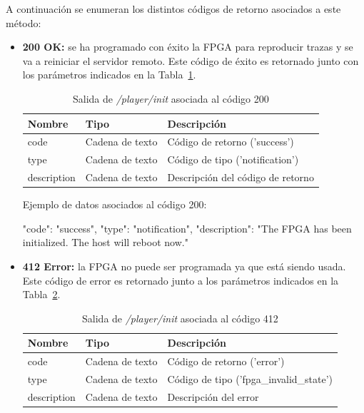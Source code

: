 A continuación se enumeran los distintos códigos de retorno asociados a este método:
\begin{itemize}

\item{\textbf{200 OK:} se ha programado con éxito la \gls{FPGA} para reproducir \glspl{traza} y se va a reiniciar el servidor remoto.
Este código de éxito es retornado junto con los parámetros indicados en la Tabla~\ref{extra:api:playerinit:ok}.
\begin{table}[H]
\centering
\begin{tabular}{|l|l|l|}
\hline
\rowcolor[HTML]{F5F5F5}
\textbf{Nombre}  & \textbf{Tipo}   & \textbf{Descripción}              \\ \hline
code             & Cadena de texto & Código de retorno ('success')     \\ \hline
type             & Cadena de texto & Código de tipo ('notification')   \\ \hline
description      & Cadena de texto & Descripción del código de retorno \\ \hline
\end{tabular}
\caption{Salida de \textit{/player/init} asociada al código 200}
\label{extra:api:playerinit:ok}
\end{table}
\begin{minipage}{\textwidth}
Ejemplo de datos asociados al código 200:

\begin{code}[language=json]
{
  "code": "success",
  "type": "notification",
  "description": "The FPGA has been initialized. The host will reboot now."
}
\end{code}
\end{minipage}
}

\item{\textbf{412 Error:} la \gls{FPGA} no puede ser programada ya que está siendo usada.
Este código de error es retornado junto a los parámetros indicados en la Tabla~\ref{extra:api:playerinit:error}.
\begin{table}[H]
\centering
\begin{tabular}{|l|l|l|}
\hline
\rowcolor[HTML]{F5F5F5}
\textbf{Nombre}  & \textbf{Tipo}   & \textbf{Descripción}                    \\ \hline
code             & Cadena de texto & Código de retorno ('error')             \\ \hline
type             & Cadena de texto & Código de tipo ('fpga\_invalid\_state') \\ \hline
description      & Cadena de texto & Descripción del error                   \\ \hline
\end{tabular}
\caption{Salida de \textit{/player/init} asociada al código 412}
\label{extra:api:playerinit:error}
\end{table}

}
\end{itemize}
